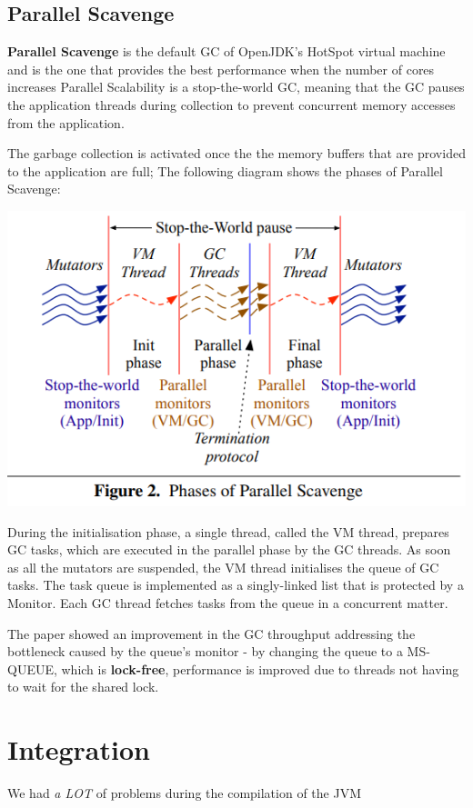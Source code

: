 \documentclass{article}
\begin{document}
  \subsection{Parallel Scavenge}
  \textbf{Parallel Scavenge} is the default GC of OpenJDK’s HotSpot virtual machine and is the one that provides the best performance when the number of cores increases\cite{paper}
  Parallel Scalability is a stop-the-world GC, meaning that the GC pauses the application threads during collection to prevent concurrent memory accesses from the application.

  The garbage collection is activated once the the memory buffers that are provided to the application are full; The following diagram shows the phases of Parallel Scavenge:

  \includegraphics[width=\textwidth]{gc_phases.png}

  During the initialisation phase, a single thread, called the VM thread, prepares GC tasks, which are executed in the parallel phase by the GC threads.
  As soon as all the mutators are suspended, the VM thread initialises the queue of GC tasks. The task queue is implemented as a singly-linked list that is protected by a Monitor.
  Each GC thread fetches tasks from the queue in a concurrent matter. 
  
  The paper showed an improvement in the GC throughput addressing the bottleneck caused by the queue's monitor - by changing the queue to a MS-QUEUE, which is \textbf{lock-free}, performance is improved due to threads not having to wait for the shared lock.

  \newpage

  \section{Integration}
  We had \textit{a LOT} of problems during the compilation of the JVM
\end{document}
